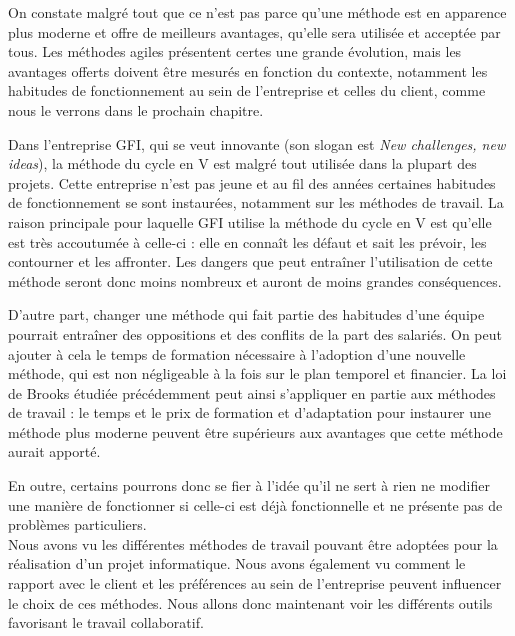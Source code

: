 On constate malgré tout que ce n'est pas parce qu'une méthode est en apparence plus moderne et offre de meilleurs avantages, qu'elle sera utilisée et acceptée par tous. Les méthodes agiles présentent certes une grande évolution, mais les avantages offerts doivent être mesurés en fonction du contexte, notamment les habitudes de fonctionnement au sein de l'entreprise et celles du client, comme nous le verrons dans le prochain chapitre.

\begin{app}
Dans l'entreprise GFI, qui se veut innovante (son slogan est \textit{New challenges, new ideas}), la méthode du cycle en V est malgré tout utilisée dans la plupart des projets. Cette entreprise n'est pas jeune et au fil des années certaines habitudes de fonctionnement se sont instaurées, notamment sur les méthodes de travail. La raison principale pour laquelle GFI utilise la méthode du cycle en V est qu'elle est très accoutumée à celle-ci : elle en connaît les défaut et sait les prévoir, les contourner et les affronter. Les dangers que peut entraîner l'utilisation de cette méthode seront donc moins nombreux et auront de moins grandes conséquences.
\end{app}

D'autre part, changer une méthode qui fait partie des habitudes d'une équipe pourrait entraîner des oppositions et des conflits de la part des salariés. On peut ajouter à cela le temps de formation nécessaire à l'adoption d'une nouvelle méthode, qui est non négligeable à la fois sur le plan temporel et financier. La loi de Brooks étudiée précédemment peut ainsi s'appliquer en partie aux méthodes de travail : le temps et le prix de formation et d'adaptation pour instaurer une méthode plus moderne peuvent être supérieurs aux avantages que cette méthode aurait apporté.

En outre, certains pourrons donc se fier à l'idée qu'il ne sert à rien ne modifier une manière de fonctionner si celle-ci est déjà fonctionnelle et ne présente pas de problèmes particuliers.\\

Nous avons vu les différentes méthodes de travail pouvant être adoptées pour la réalisation d'un projet informatique. Nous avons également vu comment le rapport avec le client et les préférences au sein de l'entreprise peuvent influencer le choix de ces méthodes. Nous allons donc maintenant voir les différents outils favorisant le travail collaboratif.
